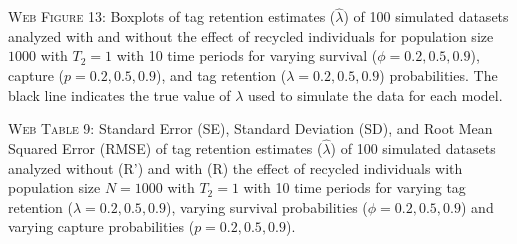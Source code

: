 \documentclass[]{article}
\begin{document}
\textsc{Web Figure 13:} Boxplots of tag retention estimates
(\(\hat{\lambda}\)) of 100 simulated datasets analyzed with and without
the effect of recycled individuals for population size \(1000\) with
\(T_2=1\) with 10 time periods for varying survival
(\(\phi=0.2,0.5,0.9\)), capture (\(p=0.2,0.5,0.9\)), and tag retention
(\(\lambda=0.2,0.5,0.9\)) probabilities. The black line indicates the
true value of \(\lambda\) used to simulate the data for each model.

\textsc{Web Table 9:} Standard Error (SE), Standard Deviation (SD), and
Root Mean Squared Error (RMSE) of tag retention estimates
(\(\hat{\lambda}\)) of 100 simulated datasets analyzed without (R') and
with (R) the effect of recycled individuals with population size
\(N=1000\) with \(T_2=1\) with 10 time periods for varying tag retention
(\(\lambda=0.2,0.5,0.9\)), varying survival probabilities
(\(\phi=0.2,0.5,0.9\)) and varying capture probabilities
(\(p=0.2,0.5,0.9\)).
\end{document}
